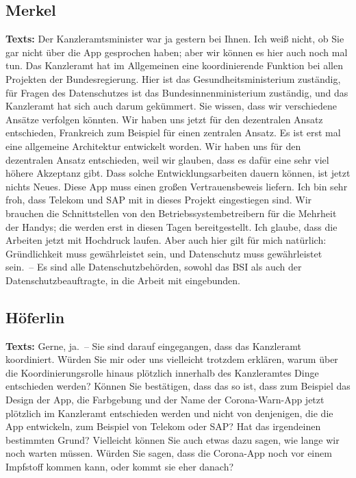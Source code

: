 \documentclass{article}
\begin{document}
\subsection{Merkel}
\noindent\textbf{Texts:} Der Kanzleramtsminister war ja gestern bei Ihnen. Ich weiß nicht, ob Sie gar nicht über die App gesprochen haben; aber wir können es hier auch noch mal tun. Das Kanzleramt hat im Allgemeinen eine koordinierende Funktion bei allen Projekten der Bundesregierung. Hier ist das Gesundheitsministerium zuständig, für Fragen des Datenschutzes ist das Bundesinnenministerium zuständig, und das Kanzleramt hat sich auch darum gekümmert. Sie wissen, dass wir verschiedene Ansätze verfolgen könnten. Wir haben uns jetzt für den dezentralen Ansatz entschieden, Frankreich zum Beispiel für einen zentralen Ansatz. Es ist erst mal eine allgemeine Architektur entwickelt worden. Wir haben uns für den dezentralen Ansatz entschieden, weil wir glauben, dass es dafür eine sehr viel höhere Akzeptanz gibt. Dass solche Entwicklungsarbeiten dauern können, ist jetzt nichts Neues. Diese App muss einen großen Vertrauensbeweis liefern. Ich bin sehr froh, dass Telekom und SAP mit in dieses Projekt eingestiegen sind. Wir brauchen die Schnittstellen von den Betriebssystembetreibern für die Mehrheit der Handys; die werden erst in diesen Tagen bereitgestellt. Ich glaube, dass die Arbeiten jetzt mit Hochdruck laufen. Aber auch hier gilt für mich natürlich: Gründlichkeit muss gewährleistet sein, und Datenschutz muss gewährleistet sein. – Es sind alle Datenschutzbehörden, sowohl das BSI als auch der Datenschutzbeauftragte, in die Arbeit mit eingebunden.

\subsection{Höferlin}
\noindent\textbf{Texts:} Gerne, ja. – Sie sind darauf eingegangen, dass das Kanzleramt koordiniert. Würden Sie mir oder uns vielleicht trotzdem erklären, warum über die Koordinierungsrolle hinaus plötzlich innerhalb des Kanzleramtes Dinge entschieden werden? Können Sie bestätigen, dass das so ist, dass zum Beispiel das Design der App, die Farbgebung und der Name der Corona-Warn-App jetzt plötzlich im Kanzleramt entschieden werden und nicht von denjenigen, die die App entwickeln, zum Beispiel von Telekom oder SAP? Hat das irgendeinen bestimmten Grund? Vielleicht können Sie auch etwas dazu sagen, wie lange wir noch warten müssen. Würden Sie sagen, dass die Corona-App noch vor einem Impfstoff kommen kann, oder kommt sie eher danach?
\end{document}
